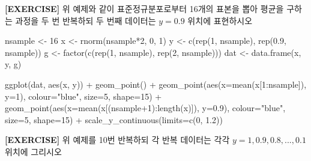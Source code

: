 \documentclass[
]{book}
\newenvironment{Shaded}{\begin{snugshade}}{\end{snugshade}}
\newcommand{\AttributeTok}[1]{\textcolor[rgb]{0.77,0.63,0.00}{#1}}
\newcommand{\DecValTok}[1]{\textcolor[rgb]{0.00,0.00,0.81}{#1}}
\newcommand{\FloatTok}[1]{\textcolor[rgb]{0.00,0.00,0.81}{#1}}
\newcommand{\FunctionTok}[1]{\textcolor[rgb]{0.00,0.00,0.00}{#1}}
\newcommand{\NormalTok}[1]{#1}
\newcommand{\OtherTok}[1]{\textcolor[rgb]{0.56,0.35,0.01}{#1}}
\newcommand{\SpecialCharTok}[1]{\textcolor[rgb]{0.00,0.00,0.00}{#1}}
\newcommand{\StringTok}[1]{\textcolor[rgb]{0.31,0.60,0.02}{#1}}
\begin{document}
\textbf{{[}EXERCISE{]}} 위 예제와 같이 표준정규분포로부터 16개의 표본을 뽑아 평균을 구하는 과정을 두 번 반복하되 두 번째 데이터는 \(y=0.9\) 위치에 표현하시오

\begin{Shaded}
\begin{Highlighting}[]
\NormalTok{nsample }\OtherTok{\textless{}{-}} \DecValTok{16}
\NormalTok{x }\OtherTok{\textless{}{-}} \FunctionTok{rnorm}\NormalTok{(nsample}\SpecialCharTok{*}\DecValTok{2}\NormalTok{, }\DecValTok{0}\NormalTok{, }\DecValTok{1}\NormalTok{)}
\NormalTok{y }\OtherTok{\textless{}{-}} \FunctionTok{c}\NormalTok{(}\FunctionTok{rep}\NormalTok{(}\DecValTok{1}\NormalTok{, nsample), }\FunctionTok{rep}\NormalTok{(}\FloatTok{0.9}\NormalTok{, nsample))}
\NormalTok{g }\OtherTok{\textless{}{-}} \FunctionTok{factor}\NormalTok{(}\FunctionTok{c}\NormalTok{(}\FunctionTok{rep}\NormalTok{(}\DecValTok{1}\NormalTok{, nsample), }\FunctionTok{rep}\NormalTok{(}\DecValTok{2}\NormalTok{, nsample)))}
\NormalTok{dat }\OtherTok{\textless{}{-}} \FunctionTok{data.frame}\NormalTok{(x, y, g)}

\FunctionTok{ggplot}\NormalTok{(dat, }\FunctionTok{aes}\NormalTok{(x, y)) }\SpecialCharTok{+}
  \FunctionTok{geom\_point}\NormalTok{() }\SpecialCharTok{+}
  \FunctionTok{geom\_point}\NormalTok{(}\FunctionTok{aes}\NormalTok{(}\AttributeTok{x=}\FunctionTok{mean}\NormalTok{(x[}\DecValTok{1}\SpecialCharTok{:}\NormalTok{nsample]), }\AttributeTok{y=}\DecValTok{1}\NormalTok{), }\AttributeTok{colour=}\StringTok{"blue"}\NormalTok{, }\AttributeTok{size=}\DecValTok{5}\NormalTok{, }\AttributeTok{shape=}\DecValTok{15}\NormalTok{) }\SpecialCharTok{+}
  \FunctionTok{geom\_point}\NormalTok{(}\FunctionTok{aes}\NormalTok{(}\AttributeTok{x=}\FunctionTok{mean}\NormalTok{(x[(nsample}\SpecialCharTok{+}\DecValTok{1}\NormalTok{)}\SpecialCharTok{:}\FunctionTok{length}\NormalTok{(x)]), }\AttributeTok{y=}\FloatTok{0.9}\NormalTok{), }\AttributeTok{colour=}\StringTok{"blue"}\NormalTok{, }\AttributeTok{size=}\DecValTok{5}\NormalTok{, }\AttributeTok{shape=}\DecValTok{15}\NormalTok{) }\SpecialCharTok{+}
  \FunctionTok{scale\_y\_continuous}\NormalTok{(}\AttributeTok{limits=}\FunctionTok{c}\NormalTok{(}\DecValTok{0}\NormalTok{, }\FloatTok{1.2}\NormalTok{))}
\end{Highlighting}
\end{Shaded}

\textbf{{[}EXERCISE{]}} 위 예제를 10번 반복하되 각 반복 데이터는 각각 \(y=1, 0.9, 0.8, ..., 0.1\) 위치에 그리시오
\end{document}

